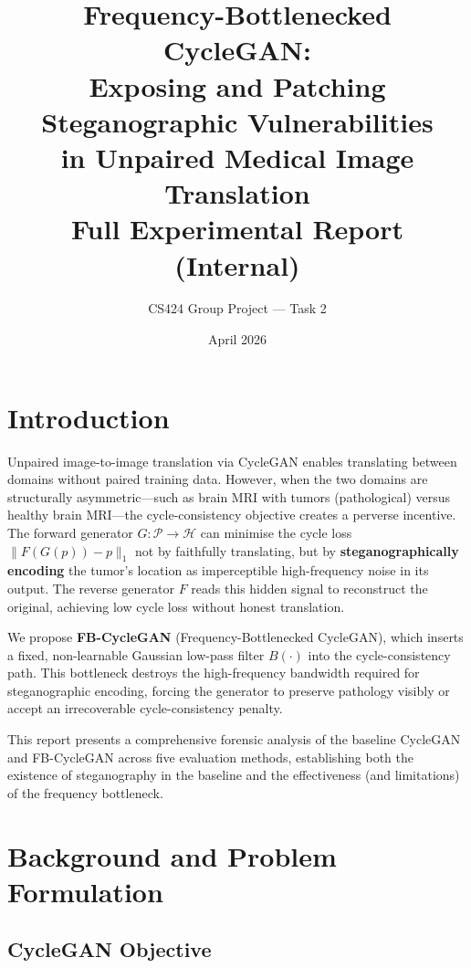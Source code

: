 \documentclass[11pt,a4paper]{article}
\title{\textbf{Frequency-Bottlenecked CycleGAN:}\\
\textbf{Exposing and Patching Steganographic Vulnerabilities}\\
\textbf{in Unpaired Medical Image Translation}\\[1em]
\Large Full Experimental Report (Internal)}
\author{CS424 Group Project --- Task 2}
\date{April 2026}
\theoremstyle{definition}
\begin{document}
\maketitle
\tableofcontents
\newpage

\section{Introduction}

Unpaired image-to-image translation via CycleGAN enables translating between domains without paired training data. However, when the two domains are structurally asymmetric---such as brain MRI with tumors (pathological) versus healthy brain MRI---the cycle-consistency objective creates a perverse incentive. The forward generator $G: \mathcal{P} \to \mathcal{H}$ can minimise the cycle loss $\|F(G(p)) - p\|_1$ not by faithfully translating, but by \textbf{steganographically encoding} the tumor's location as imperceptible high-frequency noise in its output. The reverse generator $F$ reads this hidden signal to reconstruct the original, achieving low cycle loss without honest translation.

We propose \textbf{FB-CycleGAN} (Frequency-Bottlenecked CycleGAN), which inserts a fixed, non-learnable Gaussian low-pass filter $B(\cdot)$ into the cycle-consistency path. This bottleneck destroys the high-frequency bandwidth required for steganographic encoding, forcing the generator to preserve pathology visibly or accept an irrecoverable cycle-consistency penalty.

This report presents a comprehensive forensic analysis of the baseline CycleGAN and FB-CycleGAN across five evaluation methods, establishing both the existence of steganography in the baseline and the effectiveness (and limitations) of the frequency bottleneck.

\section{Background and Problem Formulation}

\subsection{CycleGAN Objective}
\end{document}
